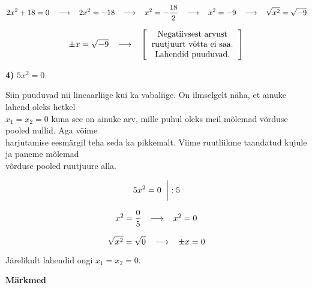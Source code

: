 \begin{center}
{{{\begin{flushleft}
\[2x^{2}+18=0 \hspace{3mm} \longrightarrow \hspace{3mm} 2x^{2}=-18
 \hspace{3mm} \longrightarrow \hspace{3mm} x^{2}=-\dfrac{18}{2} \hspace{3mm} \longrightarrow \hspace{3mm} x^{2}=-9 \hspace{3mm} \longrightarrow \hspace{3mm} \sqrt{x^{2}}=\sqrt{-9} \]

\[ \pm x = \sqrt{-9} \hspace{3mm} \longrightarrow \hspace{3mm} \left[ \begin{tabular}{c}
Negatiivsest arvust\\
ruutjuurt võtta ei saa.\\
Lahendid puuduvad.
\end{tabular} \right] \] 

\vspace{2mm}
\hspace{5mm}
\textbf{4)} $5x^{2}=0$

\vspace{2mm}
\hspace{5mm}
Siin puuduvad nii lineaarliige kui ka vabaliige. On ilmselgelt näha, et ainuke lahend oleks hetkel\\ \hspace{5mm} $x_{1}=x_{2}=0$ kuna see on ainuke arv, mille puhul oleks meil mõlemad võrduse pooled nullid. Aga võime\\ \hspace{5mm} harjutamise eesmärgil teha seda ka pikkemalt. Viime ruutliikme taandatud kujule ja paneme mõlemad\\ \hspace{5mm} võrduse pooled ruutjuure alla.

\[ 5x^{2}=0 \hspace{2mm} \bigg| :5 \]

\[x^{2}=\dfrac{0}{5} \hspace{3mm} \longrightarrow \hspace{3mm} x^{2}=0  \]

\[\sqrt{x^{2}}=\sqrt{0} \hspace{3mm} \longrightarrow \hspace{3mm} \pm x=0 \]

\hspace{5mm}
Järelikult lahendid ongi $x_{1}=x_{2}=0$.

\end{flushleft}
}}}
\end{center}
\vspace{0.5cm}

\textbf{Märkmed}\\
\vspace{2mm}
\begin{mdframed}[style=graphpaper]
\vspace{2cm}
\end{mdframed}
